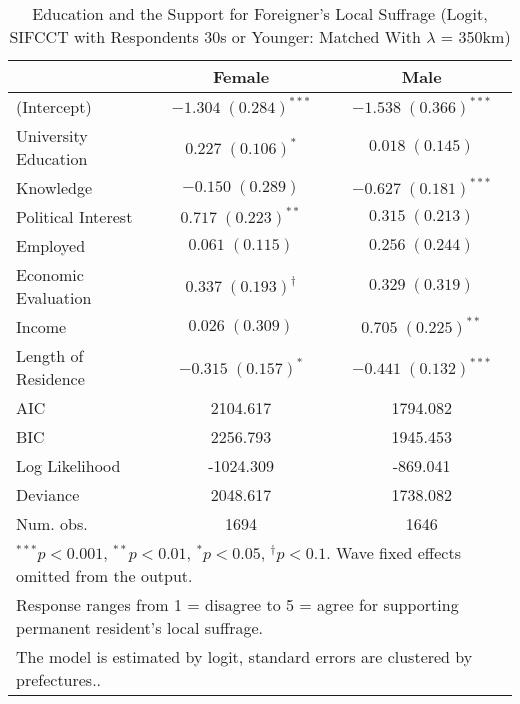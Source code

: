 
\begin{table}
\caption{Education and the Support for Foreigner's Local Suffrage (Logit, SIFCCT with Respondents 30s or Younger: Matched With $\lambda$ = 350km)}
\begin{center}
\begin{tabular}{l c c }
\toprule
 & Female & Male \\
\midrule
(Intercept)          & $-1.304 \; (0.284)^{***}$    & $-1.538 \; (0.366)^{***}$ \\
University Education & $0.227 \; (0.106)^{*}$       & $0.018 \; (0.145)$        \\
Knowledge            & $-0.150 \; (0.289)$          & $-0.627 \; (0.181)^{***}$ \\
Political Interest   & $0.717 \; (0.223)^{**}$      & $0.315 \; (0.213)$        \\
Employed             & $0.061 \; (0.115)$           & $0.256 \; (0.244)$        \\
Economic Evaluation  & $0.337 \; (0.193)^{\dagger}$ & $0.329 \; (0.319)$        \\
Income               & $0.026 \; (0.309)$           & $0.705 \; (0.225)^{**}$   \\
Length of Residence  & $-0.315 \; (0.157)^{*}$      & $-0.441 \; (0.132)^{***}$ \\
\midrule
AIC                  & 2104.617                     & 1794.082                  \\
BIC                  & 2256.793                     & 1945.453                  \\
Log Likelihood       & -1024.309                    & -869.041                  \\
Deviance             & 2048.617                     & 1738.082                  \\
Num. obs.            & 1694                         & 1646                      \\
\bottomrule
\multicolumn{3}{l}{\scriptsize{$^{***}p<0.001$, $^{**}p<0.01$, $^*p<0.05$, $^{\dagger}p<0.1$. Wave fixed effects omitted from the output.}} \\ \multicolumn{3}{l}{\scriptsize{Response ranges from 1 = disagree to 5 = agree for supporting permanent resident's local suffrage.}} \\ \multicolumn{3}{l}{\scriptsize{The model is estimated by logit, standard errors are clustered by prefectures..}}
\end{tabular}
\label{lgtab_smo_m5}
\end{center}
\end{table}

